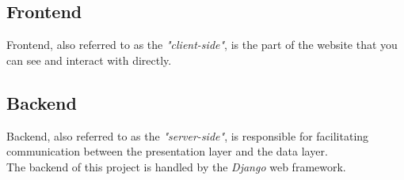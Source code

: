 \documentclass[12pt, a4paper]{report}
\begin{document}
    \subsection{Frontend}
    Frontend, also referred to as the \emph{"client-side"}, is the part of the website that you can see and interact with directly.
    
    \subsection{Backend}
    Backend, also referred to as the \emph{"server-side"}, is responsible for facilitating communication between the presentation layer and the data layer.\\
    The backend of this project is handled by the \emph{Django} web framework.\\
\end{document}
